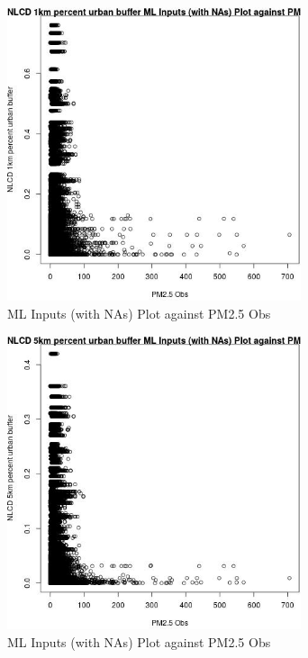 \begin{figure} 
\centering  
\includegraphics[width=0.77\textwidth]{Code_Outputs/Report_ML_input_PM25_Step4_part_e_de_duplicated_aves_compiled_2019-05-14wNAs_NLCD_1km_percent_urban_buffervPM25_Obs.jpg} 
\caption{\label{fig:Report_ML_input_PM25_Step4_part_e_de_duplicated_aves_compiled_2019-05-14wNAsNLCD_1km_percent_urban_buffervPM25_Obs}ML Inputs (with NAs) Plot against PM2.5 Obs} 
\end{figure} 
 

\clearpage 

\begin{figure} 
\centering  
\includegraphics[width=0.77\textwidth]{Code_Outputs/Report_ML_input_PM25_Step4_part_e_de_duplicated_aves_compiled_2019-05-14wNAs_NLCD_5km_percent_urban_buffervPM25_Obs.jpg} 
\caption{\label{fig:Report_ML_input_PM25_Step4_part_e_de_duplicated_aves_compiled_2019-05-14wNAsNLCD_5km_percent_urban_buffervPM25_Obs}ML Inputs (with NAs) Plot against PM2.5 Obs} 
\end{figure} 
 

